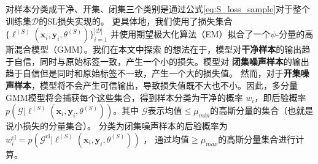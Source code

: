 \documentclass[11pt]{article}
\begin{document}
对样本分类成干净、开集、闭集三个类别是通过公式\eqref{eq:S_loss_sample}对于整个训练集$\mathcal{D}$的SL损失实现的。
更具体地，我们使用了损失集合$\{ \ell^{(S)}(\mathbf{x}_i,\mathbf{y}_i,\theta^{(S)}) \}_{i=1}^{|\mathcal{D}|}$ 
并使用期望极大化算法（EM）拟合了一个$\psi$-分量的高斯混合模型（GMM）。我们在本文中探索
的想法在于，模型对\textbf{干净样本}的输出趋于自信，同时与原始标签一致，产生一个小的损失。模型对
\textbf{闭集噪声样本}的输出趋于自信但是同时和原始标签不一致，产生一个大的损失值。
然而，对于\textbf{开集噪声样本}，模型将不会产生可信输出，导致损失值既不大也不小。因此，多分量
GMM模型将会捕获每个这些集合，得到样本分类为干净的概率 $w_i$，即后验概率
$p(\mathcal{G}|\ell^{(S)}(\mathbf{x}_i,\mathbf{y}_i,\theta^{(S)}))$。其中
$\mathcal{G}$表示均值$\leq \mu_{min}$的高斯分量的集合（也就是说小损失的分量集合）。
分类为闭集噪声样本的后验概率为$w_i^{\text{cl}}=p(\mathcal{G}^{\text{cl}}|\ell^{(S)}(\mathbf{x}_i,\mathbf{y}_i,\theta^{(S)}))$ ，
通过均值$\geq \mu_{max}$的高斯分量集合进行计算。
\end{document}
